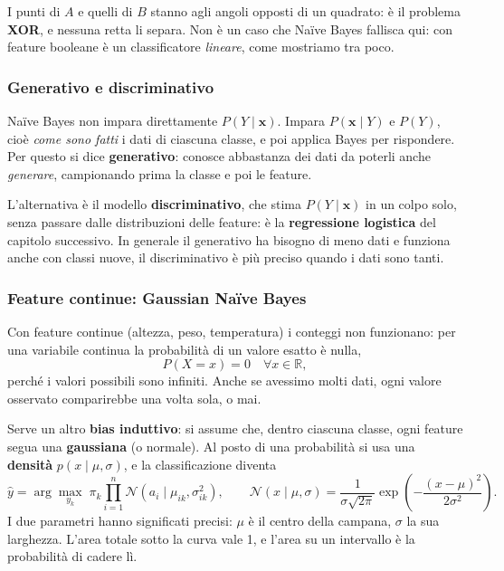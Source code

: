 \documentclass[12pt]{extarticle}
\begin{document}
\noindent I punti di $A$ e quelli di $B$ stanno agli angoli opposti di un quadrato: è il problema \textbf{XOR}, e nessuna retta li separa. Non è un caso che Naïve Bayes fallisca qui: con feature booleane è un classificatore \emph{lineare}, come mostriamo tra poco.

\subsubsection{Generativo e discriminativo}

\noindent Naïve Bayes non impara direttamente $P(Y\mid \mathbf{x})$. Impara $P(\mathbf{x}\mid Y)$ e $P(Y)$, cioè \emph{come sono fatti} i dati di ciascuna classe, e poi applica Bayes per rispondere. Per questo si dice \textbf{generativo}: conosce abbastanza dei dati da poterli anche \emph{generare}, campionando prima la classe e poi le feature.

\noindent L'alternativa è il modello \textbf{discriminativo}, che stima $P(Y\mid \mathbf{x})$ in un colpo solo, senza passare dalle distribuzioni delle feature: è la \textbf{regressione logistica} del capitolo successivo. In generale il generativo ha bisogno di meno dati e funziona anche con classi nuove, il discriminativo è più preciso quando i dati sono tanti.

\subsubsection{Feature continue: Gaussian Naïve Bayes}

\noindent Con feature continue (altezza, peso, temperatura) i conteggi non funzionano: per una variabile continua la probabilità di un valore esatto è nulla,
\[
P(X=x)=0 \quad \forall x\in\mathbb{R},
\]
perché i valori possibili sono infiniti. Anche se avessimo molti dati, ogni valore osservato comparirebbe una volta sola, o mai.

\noindent Serve un altro \textbf{bias induttivo}: si assume che, dentro ciascuna classe, ogni feature segua una \textbf{gaussiana} (o normale). Al posto di una probabilità si usa una \textbf{densità} $p(x\mid\mu,\sigma)$, e la classificazione diventa
\[
\hat y = \arg\max_{y_k}\; \pi_k \prod_{i=1}^n \mathcal{N}(a_i \mid \mu_{ik}, \sigma_{ik}^2),
\qquad
\mathcal{N}(x\mid\mu,\sigma)=\frac{1}{\sigma\sqrt{2\pi}}\exp\!\left(-\frac{(x-\mu)^2}{2\sigma^2}\right).
\]
I due parametri hanno significati precisi: $\mu$ è il centro della campana, $\sigma$ la sua larghezza. L'area totale sotto la curva vale 1, e l'area su un intervallo è la probabilità di cadere lì.
\end{document}
